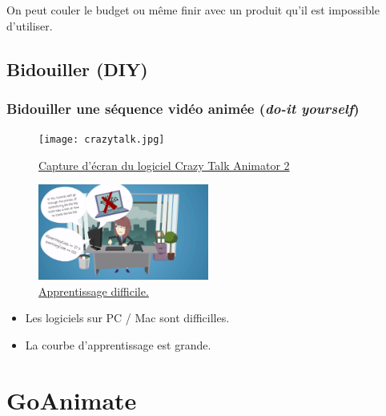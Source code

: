 \begin{frame}[allowframebreaks]
			\begin{description}
				\item[Risques] On peut couler le budget ou même finir avec un produit qu'il est impossible d'utiliser.
				
			\end{description}
				
		\end{frame}
\subsection{Bidouiller (DIY)} 
		\begin{frame}[allowframebreaks]
			\frametitle{Bidouiller une séquence vidéo animée (\textit{do-it yourself})}
			\begin{figure}
                     \centering
                     \texttt{[image: crazytalk.jpg]}
                     \caption{\tiny{\href{run:crazytalk.jpg}{Capture d'écran du logiciel Crazy Talk Animator 2 \citep{ReallusionInc2016}}}}
                   \end{figure}
			\framebreak
			\begin{figure}
                     \centering
                     \includegraphics[width = 0.5\textwidth]{apprentissage.png}
                     \caption{\tiny{\href{run:apprentissage.png}{Apprentissage difficile.}}}
                   \end{figure}
			\begin {itemize}
				\item Les logiciels sur PC / Mac sont difficilles.
				\item La courbe d'apprentissage est grande.

			\end{itemize}
			\end{frame}	
			

\section{GoAnimate} 

